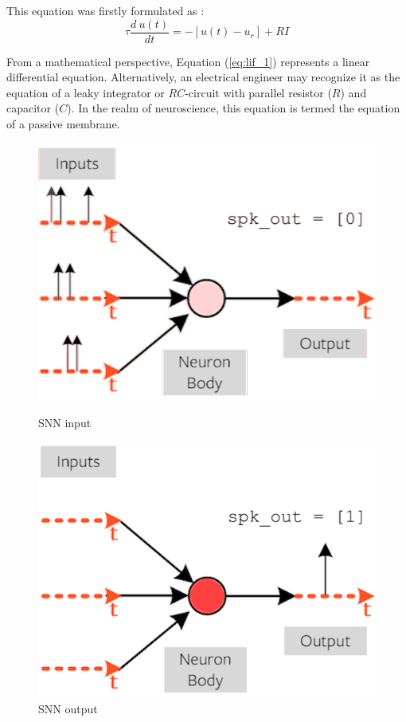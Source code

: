 \documentclass[11pt]{article}
\begin{document}
This equation was firstly formulated as :
\begin{equation}
  \tau \frac{d \: u(t)}{dt} = - [u(t) - u_{r}] + RI
  \label{eq:lif_1}
\end{equation}

From a mathematical perspective, Equation (\ref{eq:lif_1}) represents a linear differential equation. Alternatively, an electrical engineer may recognize it as the equation of a leaky integrator or $RC$-circuit with parallel resistor ($R$) and capacitor ($C$). In the realm of neuroscience, this equation is termed the equation of a passive membrane. \cite{neuronal_dynamics}

\begin{figure}[h]
  \centering
  \begin{minipage}{0.45\textwidth}
    \centering
    \includegraphics[width=1\textwidth]{image/def1.png}
    \caption{SNN input}
    \label{fig:def1}
  \end{minipage}\hfill
  \begin{minipage}{0.45\textwidth}
    \centering
    \includegraphics[width=1\textwidth]{image/def2.png}
    \caption{SNN output}
    \label{fig:def2}
  \end{minipage}
\end{figure}
\end{document}
